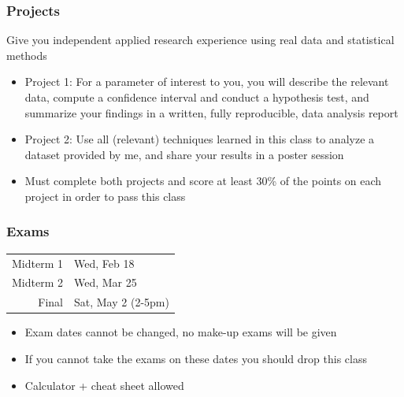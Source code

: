 \documentclass[11pt,containsverbatim,handout,xcolor=xelatex,dvipsnames,table]{beamer}
\begin{document}
\begin{frame}
\frametitle{Projects}

 Give you independent applied research experience using real data and statistical methods

\begin{itemize}

\item Project 1: For a parameter of interest to you, you will describe the relevant data, compute a confidence interval and conduct a hypothesis test, and summarize your findings in a written, fully reproducible, data analysis report

\item Project 2: Use all (relevant) techniques learned in this class to analyze a dataset provided by me, and share your results in a poster session

\item Must complete both projects and score at least 30\% of the points on each project in order to pass this class

\end{itemize}

\end{frame}


\begin{frame}
\frametitle{Exams}

\begin{center}
\renewcommand\arraystretch{1.25}
{\footnotesize
\begin{tabular}{ r | l }
Midterm 1								& Wed, Feb 18 \\    
Midterm 2 							& Wed, Mar 25 \\    
Final 								& Sat, May 2 (2-5pm)     
\end{tabular}
}
\end{center}

\begin{itemize}

\item Exam dates cannot be changed, no make-up exams will be given

\item If you cannot take the exams on these dates you should drop this class

\item Calculator + cheat sheet allowed

\end{itemize}

\end{frame}
\end{document}
